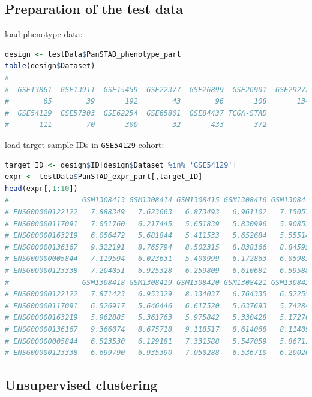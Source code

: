 \documentclass[
  12pt,
]{book}
\newcommand{\passthrough}[1]{#1}
\begin{document}
\hypertarget{preparation-of-the-test-data}{%
\subsection{Preparation of the test data}\label{preparation-of-the-test-data}}

load phenotype data:

\begin{lstlisting}[language=R]
design <- testData$PanSTAD_phenotype_part
table(design$Dataset)
# 
#  GSE13861  GSE13911  GSE15459  GSE22377  GSE26899  GSE26901  GSE29272  GSE51105 
#        65        39       192        43        96       108       134        94 
#  GSE54129  GSE57303  GSE62254  GSE65801  GSE84437 TCGA-STAD 
#       111        70       300        32       433       372
\end{lstlisting}

load target sample IDs in \passthrough{\lstinline!GSE54129!} cohort:

\begin{lstlisting}[language=R]
target_ID <- design$ID[design$Dataset %in% 'GSE54129']
expr <- testData$PanSTAD_expr_part[,target_ID]
head(expr[,1:10])
#                 GSM1308413 GSM1308414 GSM1308415 GSM1308416 GSM1308417
# ENSG00000122122   7.888349   7.623663   6.873493   6.961102   7.150572
# ENSG00000117091   7.051760   6.217445   5.651839   5.830996   5.908532
# ENSG00000163219   6.056472   5.681844   5.411533   5.652684   5.555147
# ENSG00000136167   9.322191   8.765794   8.502315   8.838166   8.845952
# ENSG00000005844   7.119594   6.023631   5.400999   6.172863   6.059838
# ENSG00000123338   7.204051   6.925328   6.259809   6.610681   6.595882
#                 GSM1308418 GSM1308419 GSM1308420 GSM1308421 GSM1308422
# ENSG00000122122   7.871423   6.953329   8.334037   6.764335   6.522554
# ENSG00000117091   6.526917   5.646446   6.617520   5.637693   5.742848
# ENSG00000163219   5.962885   5.361763   5.975842   5.330428   5.172705
# ENSG00000136167   9.366074   8.675718   9.118517   8.614068   8.114096
# ENSG00000005844   6.523530   6.129181   7.331588   5.547059   5.867118
# ENSG00000123338   6.699790   6.935390   7.050288   6.536710   6.200269
\end{lstlisting}

\hypertarget{unsupervised-clustering}{%
\subsection{Unsupervised clustering}\label{unsupervised-clustering}}
\end{document}
